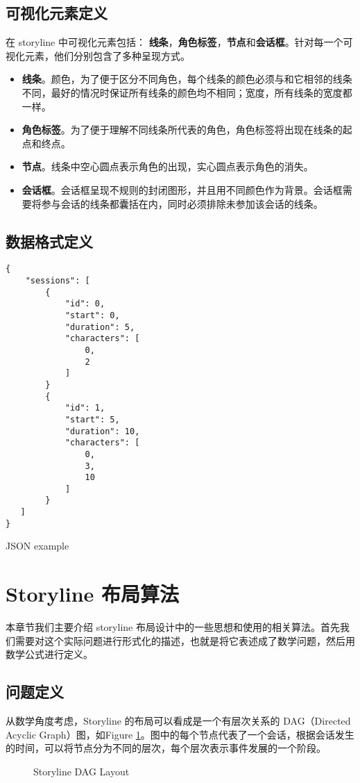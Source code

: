\subsection{可视化元素定义}
在 storyline 中可视化元素包括： \textbf{线条}，\textbf{角色标签}，\textbf{节点}和\textbf{会话框}。针对每一个可视化元素，他们分别包含了多种呈现方式。
\begin{itemize}
\item \textbf{线条}。颜色，为了便于区分不同角色，每个线条的颜色必须与和它相邻的线条不同，最好的情况时保证所有线条的颜色均不相同；宽度，所有线条的宽度都一样。
\item \textbf{角色标签}。为了便于理解不同线条所代表的角色，角色标签将出现在线条的起点和终点。
\item \textbf{节点}。线条中空心圆点表示角色的出现，实心圆点表示角色的消失。
\item \textbf{会话框}。会话框呈现不规则的封闭图形，并且用不同颜色作为背景。会话框需要将参与会话的线条都囊括在内，同时必须排除未参加该会话的线条。
\end{itemize}


\subsection{数据格式定义}
\begin{listing}
\begin{verbatim}
{
    "sessions": [
        {
            "id": 0,
            "start": 0,
            "duration": 5,
            "characters": [
                0,
                2
            ]
        }
        {
            "id": 1,
            "start": 5,
            "duration": 10,
            "characters": [
                0,
                3,
                10
            ]
        }
   ]
}
\end{verbatim}
\caption{JSON example} 
\label{json-example}
\end{listing}

\section{Storyline 布局算法}
本章节我们主要介绍 storyline 布局设计中的一些思想和使用的相关算法。首先我们需要对这个实际问题进行形式化的描述，也就是将它表述成了数学问题，然后用数学公式进行定义。
\subsection{问题定义}
 从数学角度考虑，Storyline 的布局可以看成是一个有层次关系的 DAG（Directed Acyclic Graph）图，如Figure \ref{storyline-dag}。图中的每个节点代表了一个会话，根据会话发生的时间，可以将节点分为不同的层次，每个层次表示事件发展的一个阶段。
\begin{figure}[h]
  \caption{Storyline DAG Layout}
  \label{storyline-dag}
\end{figure}

